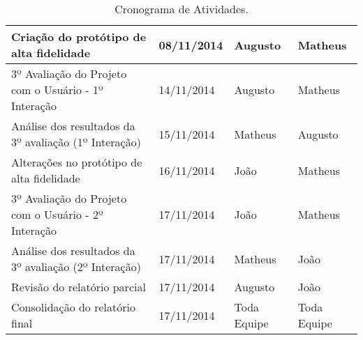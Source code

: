 \begin{table}[h]
\begin{tabular}{|p{6.5cm}|p{2.5cm}|p{2.5cm}|p{2.5cm}|}
				Criação do protótipo de alta fidelidade & 08/11/2014 & Augusto & Matheus \\ \hline

				3º Avaliação do Projeto com o Usuário - 1º Interação & 14/11/2014 & Augusto & Matheus \\ \hline

				Análise dos resultados da 3º avaliação (1º Interação) & 15/11/2014 & Matheus & Augusto \\ \hline

				Alterações no protótipo de alta fidelidade & 16/11/2014 & João & Matheus \\ \hline

				3º Avaliação do Projeto com o Usuário - 2º Interação & 17/11/2014 & João & Matheus \\ \hline

				Análise dos resultados da 3º avaliação (2º Interação) & 17/11/2014 & Matheus & João \\ \hline

				Revisão do relatório parcial & 17/11/2014 & Augusto & João \\ \hline

				Consolidação do relatório final & 17/11/2014 & Toda Equipe & Toda Equipe \\ \hline

			\end{tabular}
			\caption[Cronograma de Atividades]{Cronograma de Atividades.}
			\label{tab:versionamento_tabl}
		\end{table}
